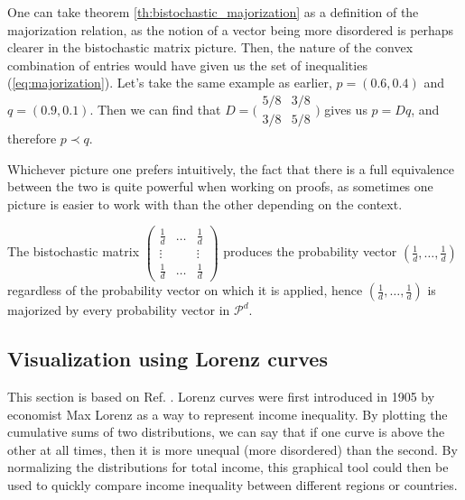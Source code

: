 One can take theorem \ref{th:bistochastic_majorization} as a definition of the majorization relation, as the notion of a vector being more disordered is perhaps clearer in the bistochastic matrix picture. Then, the nature of the convex combination %
of entries would have given us the set of inequalities (\ref{eq:majorization}). Let's take the same example as earlier, $p = (0.6, 0.4)$ and $q = (0.9, 0.1)$. Then we can find that $D = \Big(\begin{smallmatrix}
                                                                                                    5/8 & 3/8 \\
                                                                                                    3/8 & 5/8
                                                                                                \end{smallmatrix}\Big)$
gives us $p = Dq$, and therefore $p \prec q$.

Whichever picture one prefers intuitively, the fact that there is a full equivalence between the two is quite powerful when working on proofs, as sometimes one picture is easier to work with than the other depending on the context.

\begin{remark}
    The bistochastic matrix $\begin{pmatrix} \frac{1}{d} & \dots & \frac{1}{d} \\
                                                      \vdots & & \vdots \\
                                                      \frac{1}{d} & \dots & \frac{1}{d}
                             \end{pmatrix}$ 
    produces the probability vector $(\frac{1}{d}, \dots, \frac{1}{d})$ regardless of the probability vector on which it is applied, hence $(\frac{1}{d}, \dots, \frac{1}{d})$ is majorized by every probability vector in $\mathcal{P}^d$.
\end{remark}



\subsection{Visualization using Lorenz curves}

This section is based on Ref. \cite[pp. 5--6]{marshall_inequalities_2011}. Lorenz curves were first introduced in 1905 by economist Max Lorenz as a way to represent income inequality. By plotting the cumulative sums of two distributions, we can say that if one curve is above the other at all times, then it is more unequal (more disordered) than the second. By normalizing the distributions for total income, this graphical tool could then be used to quickly compare income inequality between different regions or countries.

